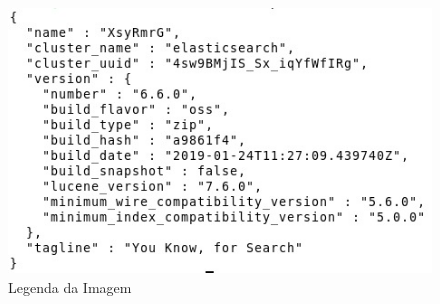 \clearpage

\begin{figure}[!htb]
	\centering
	\includegraphics[scale=1]{imagens/pretty.png}
	\caption{Legenda da Imagem}
	\label{Label de referência para a imagem}
\end{figure}
